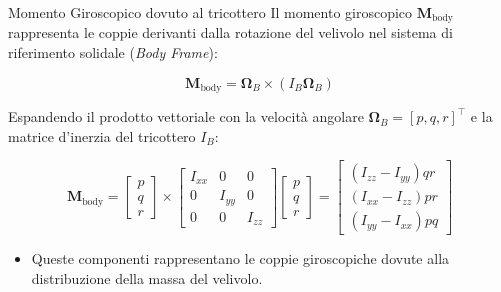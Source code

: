 \documentclass[aspectratio=169]{beamer} %
\begin{document}
\begin{frame}{Momento Giroscopico dovuto al tricottero}
    Il momento giroscopico $\bm{M}_{\text{body}}$ rappresenta le coppie derivanti dalla rotazione del velivolo nel sistema di riferimento solidale (\textit{Body Frame}):
    
    \begin{equation*}
        \bm{M}_{\text{body}} = \bm{\Omega}_{B} \times (I_{B} \bm{\Omega}_{B})
    \end{equation*}

    Espandendo il prodotto vettoriale con la velocità angolare $\bm{\Omega}_{B} = [p, q, r]^\top$ e la matrice d'inerzia del tricottero $I_{B}$:

    \begin{equation}
        \bm{M}_{\text{body}} = 
        \begin{bmatrix} p \\ q \\ r \end{bmatrix} \times 
        \begin{bmatrix} I_{xx} & 0 & 0 \\ 0 & I_{yy} & 0 \\ 0 & 0 & I_{zz} \end{bmatrix}
        \begin{bmatrix} p \\ q \\ r \end{bmatrix} =
        \begin{bmatrix} 
        (I_{zz} - I_{yy}) qr \\ 
        (I_{xx} - I_{zz}) pr \\ 
        (I_{yy} - I_{xx}) pq 
        \end{bmatrix}
    \end{equation}

    \begin{itemize}
        \item Queste componenti rappresentano le coppie giroscopiche dovute alla distribuzione della massa del velivolo.
    \end{itemize}
\end{frame}
\end{document}
